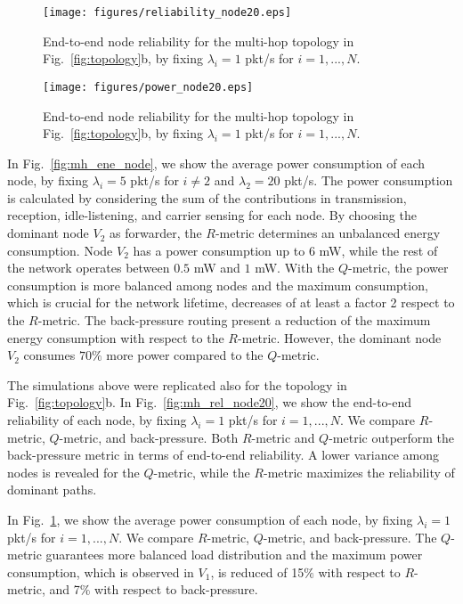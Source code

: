\documentclass[review, 1p, 11pt]{elsarticle}
\numberwithin{equation}{section}
\begin{document}
\begin{figure}[h!] \centering
\texttt{[image: figures/reliability\_node20.eps]}
\caption{End-to-end node reliability for the multi-hop
topology in Fig.~\ref{fig:topology}b, by fixing $\lambda_i=1$ pkt/s for $i=1,...,N$.\label{fig:mh_rel_node20}}
\texttt{[image: figures/power\_node20.eps]}
\caption{End-to-end node reliability for the multi-hop
topology in Fig.~\ref{fig:topology}b, by fixing $\lambda_i=1$ pkt/s for $i=1,...,N$.\label{fig:mh_pow_node20}}
\end{figure}



In Fig.~\ref{fig:mh_ene_node}, we show the average power consumption of each node, by fixing $\lambda_i=5$ pkt/s for $i\neq2$ and $\lambda_2=20$ pkt/s.
The power consumption is calculated by considering the sum of the contributions in transmission, reception, idle-listening, and carrier sensing for each node.
By choosing the dominant node $V_2$ as forwarder, the $R$-metric determines an unbalanced energy consumption. Node $V_2$ has a power consumption up to $6$ mW, while the rest of the network operates between $0.5$ mW and $1$ mW. With the $Q$-metric, the power consumption is more balanced among nodes and the maximum consumption, which is crucial for the network lifetime, decreases of at least a factor 2 respect to the $R$-metric. The back-pressure routing present a reduction of the maximum energy consumption with respect to the $R$-metric. However, the dominant node $V_2$ consumes $70\%$ more power compared to the $Q$-metric.


The simulations above were replicated also for the topology in Fig.~\ref{fig:topology}b.
In Fig.~\ref{fig:mh_rel_node20}, we show the end-to-end reliability of each node, by fixing $\lambda_i=1$ pkt/s for $i=1,...,N$. We compare $R$-metric, $Q$-metric, and back-pressure. Both $R$-metric and $Q$-metric outperform the back-pressure metric in terms of end-to-end reliability. A lower variance among nodes is revealed for the $Q$-metric, while the $R$-metric maximizes the reliability of dominant paths.

In Fig.~\ref{fig:mh_pow_node20}, we show the average power consumption of each node, by fixing $\lambda_i=1$ pkt/s for $i=1,...,N$. We compare $R$-metric, $Q$-metric, and back-pressure.
The $Q$-metric guarantees more balanced load distribution and the maximum power consumption, which is observed in $V_1$, is reduced of 15$\%$ with respect to $R$-metric, and 7$\%$ with respect to back-pressure.
\end{document}
